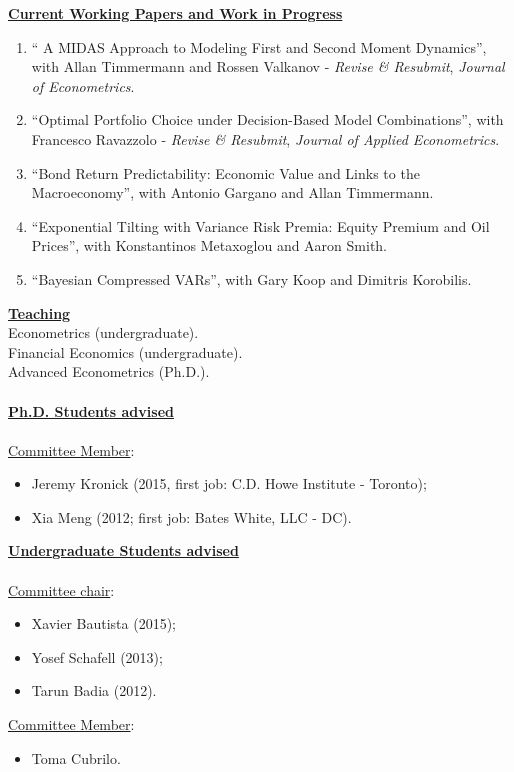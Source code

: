 \documentclass[12pt]{article}
\begin{document}
\underline{\textbf{Current Working Papers and Work in Progress}}
\begin{enumerate}
	\setcounter{enumi}{\theenumTemp}
	\item `` A MIDAS Approach to Modeling First and Second Moment Dynamics'', with Allan Timmermann and Rossen Valkanov - \textit{Revise \& Resubmit}, \emph{Journal of Econometrics}.
	\item ``Optimal Portfolio Choice under Decision-Based Model Combinations'', with Francesco Ravazzolo - \textit{Revise \& Resubmit}, \emph{Journal of Applied Econometrics}.
	\item ``Bond Return Predictability: Economic Value and Links to the Macroeconomy'', with Antonio Gargano and Allan Timmermann.
	\item ``Exponential Tilting with Variance Risk Premia: Equity Premium and Oil Prices'', with Konstantinos Metaxoglou  and Aaron Smith.
	\item ``Bayesian Compressed VARs'', with Gary Koop and Dimitris Korobilis.
	
\end{enumerate}

\underline{\textbf{Teaching}}\\
Econometrics (undergraduate).\\
Financial Economics (undergraduate). \\
Advanced Econometrics (Ph.D.). \\ \\
\underline{\textbf{Ph.D. Students advised}} \\ \\
\underline{Committee Member}: 
\begin{itemize}
	\item Jeremy Kronick (2015, first job: C.D. Howe Institute - Toronto);
	\item Xia Meng (2012; first job: Bates White, LLC - DC). 
\end{itemize}
\underline{\textbf{Undergraduate Students advised}} \\ \\
\underline{Committee chair}: 
\begin{itemize}
	\item Xavier Bautista (2015);
	\item Yosef Schafell (2013);
	\item Tarun Badia (2012). 
\end{itemize}
\underline{Committee Member}: 
\begin{itemize}
	\item Toma Cubrilo.
\end{itemize}
\end{document}
